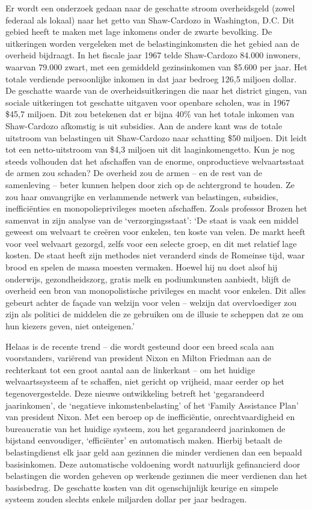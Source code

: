 \documentclass[
  a5paper,
  smalldemyvopaper,10pt,twoside,onecolumn,openright,extrafontsizes,hidelinks]{memoir}
\begin{document}
Er wordt een onderzoek gedaan naar de geschatte stroom overheidsgeld
(zowel federaal als lokaal) naar het getto van Shaw-Cardozo in
Washington, D.C. Dit gebied heeft te maken met lage inkomens onder de
zwarte bevolking. De uitkeringen worden vergeleken met de
belastinginkomsten die het gebied aan de overheid bijdraagt. In het
fiscale jaar 1967 telde Shaw-Cardozo 84.000 inwoners, waarvan 79.000
zwart, met een gemiddeld gezinsinkomen van \$5.600 per jaar. Het totale
verdiende persoonlijke inkomen in dat jaar bedroeg 126,5 miljoen dollar.
De geschatte waarde van de overheidsuitkeringen die naar het district
gingen, van sociale uitkeringen tot geschatte uitgaven voor openbare
scholen, was in 1967 \$45,7 miljoen. Dit zou betekenen dat er bijna 40\%
van het totale inkomen van Shaw-Cardozo afkomstig is uit subsidies. Aan
de andere kant was de totale uitstroom van belastingen uit Shaw-Cardozo
naar schatting \$50 miljoen. Dit leidt tot een netto-uitstroom van \$4,3
miljoen uit dit laaginkomengetto. Kun je nog steeds volhouden dat het
afschaffen van de enorme, onproductieve welvaartsstaat de armen zou
schaden? De overheid zou de armen -- en de rest van de samenleving --
beter kunnen helpen door zich op de achtergrond te houden. Ze zou haar
omvangrijke en verlammende netwerk van belastingen, subsidies,
inefficiënties en monopolieprivileges moeten afschaffen. Zoals professor
Brozen het samenvat in zijn analyse van de `verzorgingsstaat': `De staat
is vaak een middel geweest om welvaart te creëren voor enkelen, ten
koste van velen. De markt heeft voor veel welvaart gezorgd, zelfs voor
een selecte groep, en dit met relatief lage kosten. De staat heeft zijn
methodes niet veranderd sinds de Romeinse tijd, waar brood en spelen de
massa moesten vermaken. Hoewel hij nu doet alsof hij onderwijs,
gezondheidszorg, gratis melk en podiumkunsten aanbiedt, blijft de
overheid een bron van monopolistische privileges en macht voor enkelen.
Dit alles gebeurt achter de façade van welzijn voor velen -- welzijn dat
overvloediger zou zijn als politici de middelen die ze gebruiken om de
illusie te scheppen dat ze om hun kiezers geven, niet onteigenen.'

Helaas is de recente trend -- die wordt gesteund door een breed scala
aan voorstanders, variërend van president Nixon en Milton Friedman aan
de rechterkant tot een groot aantal aan de linkerkant -- om het huidige
welvaartssysteem af te schaffen, niet gericht op vrijheid, maar eerder
op het tegenovergestelde. Deze nieuwe ontwikkeling betreft het
`gegarandeerd jaarinkomen', de `negatieve inkomstenbelasting' of het
`Family Assistance Plan' van president Nixon. Met een beroep op de
inefficiëntie, onrechtvaardigheid en bureaucratie van het huidige
systeem, zou het gegarandeerd jaarinkomen de bijstand eenvoudiger,
`efficiënter' en automatisch maken. Hierbij betaalt de belastingdienst
elk jaar geld aan gezinnen die minder verdienen dan een bepaald
basisinkomen. Deze automatische voldoening wordt natuurlijk gefinancierd
door belastingen die worden geheven op werkende gezinnen die meer
verdienen dan het basisbedrag. De geschatte kosten van dit
ogenschijnlijk keurige en simpele systeem zouden slechts enkele
miljarden dollar per jaar bedragen.
\end{document}
